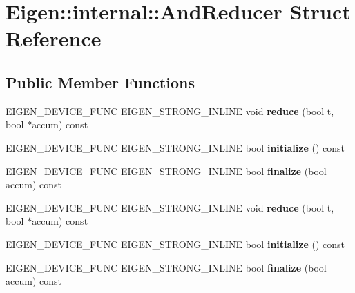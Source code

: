 \hypertarget{struct_eigen_1_1internal_1_1_and_reducer}{}\section{Eigen\+:\+:internal\+:\+:And\+Reducer Struct Reference}
\label{struct_eigen_1_1internal_1_1_and_reducer}
\subsection*{Public Member Functions}
\begin{DoxyCompactItemize}
\item 
\mbox{\label{struct_eigen_1_1internal_1_1_and_reducer_ac303758a712fed8a6c93f3958279ad1d}} 
E\+I\+G\+E\+N\+\_\+\+D\+E\+V\+I\+C\+E\+\_\+\+F\+U\+NC E\+I\+G\+E\+N\+\_\+\+S\+T\+R\+O\+N\+G\+\_\+\+I\+N\+L\+I\+NE void {\bfseries reduce} (bool t, bool $\ast$accum) const
\item 
\mbox{\label{struct_eigen_1_1internal_1_1_and_reducer_acdddc8d09285814f535a6914c10c2152}} 
E\+I\+G\+E\+N\+\_\+\+D\+E\+V\+I\+C\+E\+\_\+\+F\+U\+NC E\+I\+G\+E\+N\+\_\+\+S\+T\+R\+O\+N\+G\+\_\+\+I\+N\+L\+I\+NE bool {\bfseries initialize} () const
\item 
\mbox{\label{struct_eigen_1_1internal_1_1_and_reducer_adabaf29e8c15f3296ebb067343dff239}} 
E\+I\+G\+E\+N\+\_\+\+D\+E\+V\+I\+C\+E\+\_\+\+F\+U\+NC E\+I\+G\+E\+N\+\_\+\+S\+T\+R\+O\+N\+G\+\_\+\+I\+N\+L\+I\+NE bool {\bfseries finalize} (bool accum) const
\item 
\mbox{\label{struct_eigen_1_1internal_1_1_and_reducer_ac303758a712fed8a6c93f3958279ad1d}} 
E\+I\+G\+E\+N\+\_\+\+D\+E\+V\+I\+C\+E\+\_\+\+F\+U\+NC E\+I\+G\+E\+N\+\_\+\+S\+T\+R\+O\+N\+G\+\_\+\+I\+N\+L\+I\+NE void {\bfseries reduce} (bool t, bool $\ast$accum) const
\item 
\mbox{\label{struct_eigen_1_1internal_1_1_and_reducer_acdddc8d09285814f535a6914c10c2152}} 
E\+I\+G\+E\+N\+\_\+\+D\+E\+V\+I\+C\+E\+\_\+\+F\+U\+NC E\+I\+G\+E\+N\+\_\+\+S\+T\+R\+O\+N\+G\+\_\+\+I\+N\+L\+I\+NE bool {\bfseries initialize} () const
\item 
\mbox{\label{struct_eigen_1_1internal_1_1_and_reducer_adabaf29e8c15f3296ebb067343dff239}} 
E\+I\+G\+E\+N\+\_\+\+D\+E\+V\+I\+C\+E\+\_\+\+F\+U\+NC E\+I\+G\+E\+N\+\_\+\+S\+T\+R\+O\+N\+G\+\_\+\+I\+N\+L\+I\+NE bool {\bfseries finalize} (bool accum) const
\end{DoxyCompactItemize}
